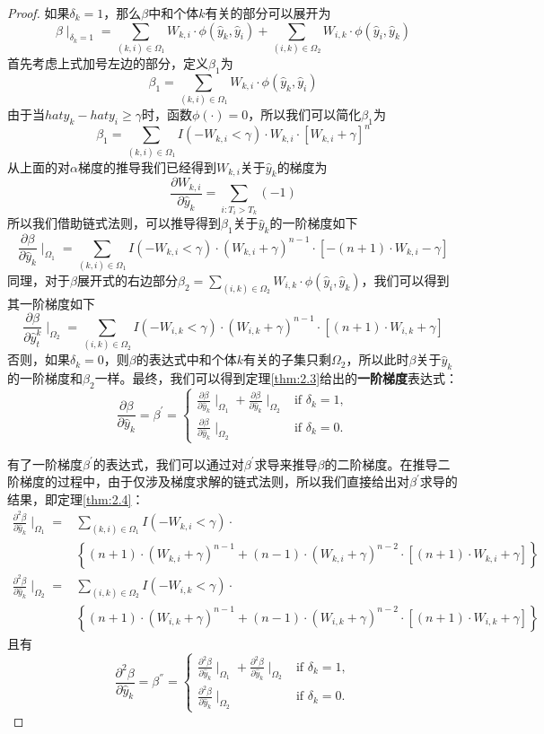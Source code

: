 \begin{proof}
如果$\delta_k = 1$，那么$\beta$中和个体$k$有关的部分可以展开为$$\beta \mid_{\delta_k=1}=\sum_{(k,i)\in \Omega_1} W_{k,i}\cdot \phi(\hat{y}_k, \hat{y}_i) + \sum_{(i,k)\in \Omega_2} W_{i,k}\cdot \phi(\hat{y}_i, \hat{y}_k) $$ 首先考虑上式加号左边的部分，定义$\beta_1$为$$\beta_1 = \sum_{(k,i)\in \Omega_1} W_{k,i}\cdot \phi(\hat{y}_k, \hat{y}_i)$$ 由于当$hat{y}_k - hat{y}_i \ge \gamma$时，函数$\phi(\cdot)=0$，所以我们可以简化$\beta_1$为$$\beta_1 = \sum_{(k,i)\in \Omega_1} I(-W_{k,i} < \gamma) \cdot W_{k,i}\cdot [W_{k,i} + \gamma]^n $$ 从上面的对$\alpha$梯度的推导我们已经得到$W_{k,i}$关于$\hat{y}_k$的梯度为$$\frac{\partial W_{k,i}}{\partial \hat{y}_k} = \sum\limits_{i: T_i>T_k}(-1)$$ 所以我们借助链式法则，可以推导得到$\beta_1$关于$\hat{y}_k$的一阶梯度如下$$
\frac{\partial \beta}{\partial \hat{y}_k} \mid_{\Omega_1} = \sum\limits_{(k,i)\in \Omega_1} {I(-W_{k,i}<\gamma)\cdot (W_{k,i}+\gamma)^{n-1}\cdot [-(n+1)\cdot W_{k,i}-\gamma]}
$$ 同理，对于$\beta$展开式的右边部分$\beta_2=\sum_{(i,k)\in \Omega_2} W_{i,k}\cdot \phi(\hat{y}_i, \hat{y}_k)$，我们可以得到其一阶梯度如下$$
\frac{\partial \beta}{\partial \hat{y}_t^k} \mid_{\Omega_2} = \sum\limits_{(i,k)\in \Omega_2} {I(-W_{i,k}<\gamma)\cdot (W_{i,k}+\gamma)^{n-1}\cdot [(n+1)\cdot W_{i,k}+\gamma]}
$$ 否则，如果$\delta_k = 0$，则$\beta$的表达式中和个体$k$有关的子集只剩$\Omega_2$，所以此时$\beta$关于$\hat{y}_k$的一阶梯度和$\beta_2$一样。最终，我们可以得到定理\ref{thm:2.3}给出的\textbf{一阶梯度}表达式：$$
\frac{\partial \beta}{\partial \hat{y}_k}=\beta^{'}=
\begin{cases}
\frac{\partial \beta}{\partial \hat{y}_k} \mid_{\Omega_1} + \frac{\partial \beta}{\partial \hat{y}_k} \mid_{\Omega_2} & \text{if } \delta_k = 1,\\
\frac{\partial \beta}{\partial \hat{y}_k} \mid_{\Omega_2} & \text{if } \delta_k = 0.
\end{cases}
$$

有了一阶梯度$\beta^{'}$的表达式，我们可以通过对$\beta^{'}$求导来推导$\beta$的二阶梯度。在推导二阶梯度的过程中，由于仅涉及梯度求解的链式法则，所以我们直接给出对$\beta^{'}$求导的结果，即定理\ref{thm:2.4}：\[
\begin{split}
\frac{\partial^2 \beta}{\partial \hat{y}_k} \mid_{\Omega_1} =& \sum\limits_{(k,i)\in \Omega_1} I(-W_{k,i}<\gamma)\cdot \\
  & \left\{(n+1)\cdot (W_{k,i}+\gamma)^{n-1} + (n-1)\cdot (W_{k,i}+\gamma)^{n-2}\cdot [(n+1)\cdot W_{k,i}+\gamma]\right\} \\
\frac{\partial^2 \beta}{\partial \hat{y}_k} \mid_{\Omega_2} =& \sum\limits_{(i,k)\in \Omega_2} I(-W_{i,k}<\gamma)\cdot \\
  & \left\{(n+1)\cdot (W_{i,k}+\gamma)^{n-1} + (n-1)\cdot (W_{i,k}+\gamma)^{n-2}\cdot [(n+1)\cdot W_{i,k}+\gamma]\right\}
\end{split}
\] 且有$$
\frac{\partial^2 \beta}{\partial \hat{y}_k}=\beta^{''}=
\begin{cases}
\frac{\partial^2 \beta}{\partial \hat{y}_k} \mid_{\Omega_1} + \frac{\partial^2 \beta}{\partial \hat{y}_k} \mid_{\Omega_2} & \text{if } \delta_k = 1,\\
\frac{\partial^2 \beta}{\partial \hat{y}_k} \mid_{\Omega_2} & \text{if } \delta_k = 0.
\end{cases}
$$
\end{proof}